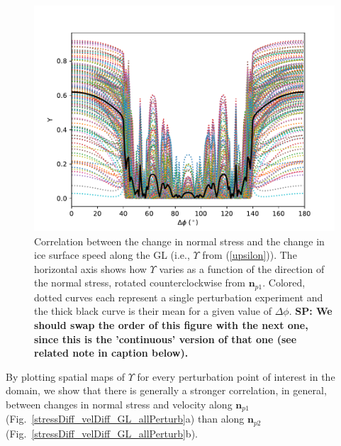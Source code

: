 \documentclass[tc, manuscript]{copernicus}
\begin{document}
\begin{figure}
	\centering
    \includegraphics[width=1\linewidth]{figs/stress_vel_corr_GL_allP.pdf}
    \caption{Correlation between the change in normal stress and the change in ice surface speed along the GL (i.e., $\Upsilon$ from (\ref{upsilon})). The horizontal axis shows how $\Upsilon$ varies as a function of the direction of the normal stress, rotated counterclockwise from $\mathbf{n}_{p1}$. Colored, dotted curves each represent a single perturbation experiment and the thick black curve is their mean for a given value of $\Delta\phi$. \textbf{SP: We should swap the order of this figure with the next one, since this is the 'continuous' version of that one (see related note in caption below).}}
	\label{stress_vel_corr_GL_allP}
\end{figure}
By plotting spatial maps of $\Upsilon$ for every perturbation point of interest in the domain, we show that there is generally a stronger correlation, in general, between changes in normal stress and velocity along $\mathbf{n}_{p1}$ (Fig.~\ref{stressDiff_velDiff_GL_allPerturb}a) than along $\mathbf{n}_{p2}$ (Fig.~\ref{stressDiff_velDiff_GL_allPerturb}b).  
\end{document}
